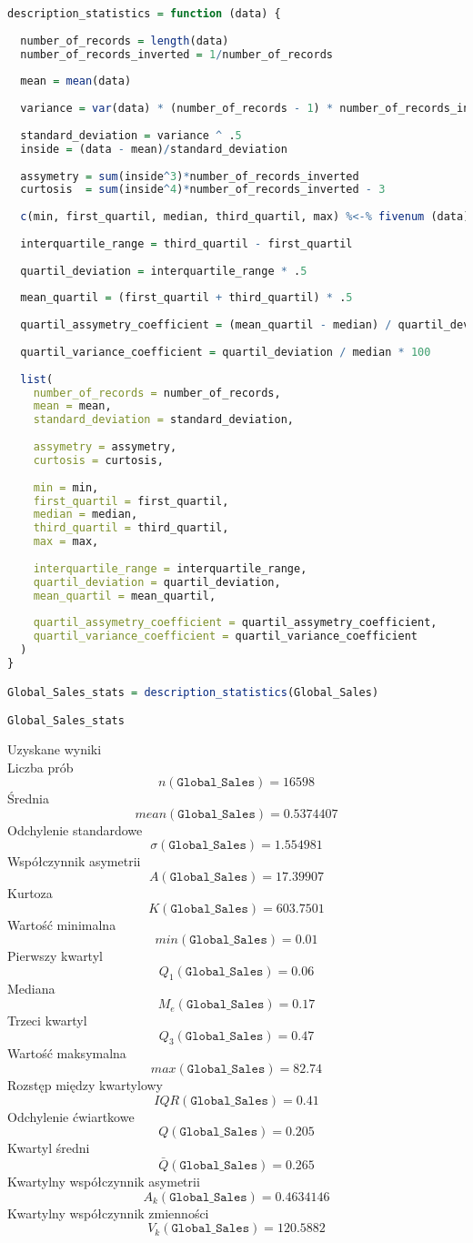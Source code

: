 	\begin{lstlisting}[language=R]
description_statistics = function (data) {
  
  number_of_records = length(data)
  number_of_records_inverted = 1/number_of_records
  
  mean = mean(data)
  
  variance = var(data) * (number_of_records - 1) * number_of_records_inverted
  
  standard_deviation = variance ^ .5
  inside = (data - mean)/standard_deviation
  
  assymetry = sum(inside^3)*number_of_records_inverted
  curtosis  = sum(inside^4)*number_of_records_inverted - 3
  
  c(min, first_quartil, median, third_quartil, max) %<-% fivenum (data)
  
  interquartile_range = third_quartil - first_quartil
  
  quartil_deviation = interquartile_range * .5
  
  mean_quartil = (first_quartil + third_quartil) * .5
  
  quartil_assymetry_coefficient = (mean_quartil - median) / quartil_deviation
  
  quartil_variance_coefficient = quartil_deviation / median * 100
  
  list(
    number_of_records = number_of_records,
    mean = mean,
    standard_deviation = standard_deviation,
    
    assymetry = assymetry,
    curtosis = curtosis,
    
    min = min,
    first_quartil = first_quartil,
    median = median,
    third_quartil = third_quartil,
    max = max,
    
    interquartile_range = interquartile_range,
    quartil_deviation = quartil_deviation,
    mean_quartil = mean_quartil,
    
    quartil_assymetry_coefficient = quartil_assymetry_coefficient,
    quartil_variance_coefficient = quartil_variance_coefficient
  )
}

Global_Sales_stats = description_statistics(Global_Sales)

Global_Sales_stats
\end{lstlisting}
	Uzyskane wyniki\\
	Liczba prób
	$$n(\texttt{Global\_Sales}) = 16598$$
	Średnia
	$$mean(\texttt{Global\_Sales}) = 0.5374407$$
	Odchylenie standardowe
	$$\sigma(\texttt{Global\_Sales}) = 1.554981$$
	Współczynnik asymetrii
	$$A(\texttt{Global\_Sales}) = 17.39907$$
	Kurtoza
	$$K(\texttt{Global\_Sales}) = 603.7501$$
	Wartość minimalna
	$$min(\texttt{Global\_Sales}) = 0.01$$
	Pierwszy kwartyl
	$$Q_1(\texttt{Global\_Sales}) = 0.06$$
	Mediana
	$$M_e(\texttt{Global\_Sales}) = 0.17$$
	Trzeci kwartyl
	$$Q_3(\texttt{Global\_Sales}) = 0.47$$
	Wartość maksymalna
	$$max(\texttt{Global\_Sales}) = 82.74$$
	Rozstęp między kwartylowy
	$$IQR(\texttt{Global\_Sales}) = 0.41$$
	Odchylenie ćwiartkowe
	$$Q(\texttt{Global\_Sales}) = 0.205$$
	Kwartyl średni
	$$\bar{Q}(\texttt{Global\_Sales}) = 0.265$$
	Kwartylny współczynnik asymetrii
	$$A_k(\texttt{Global\_Sales}) = 0.4634146$$
	Kwartylny współczynnik zmienności
	$$V_k(\texttt{Global\_Sales}) = 120.5882$$
	
